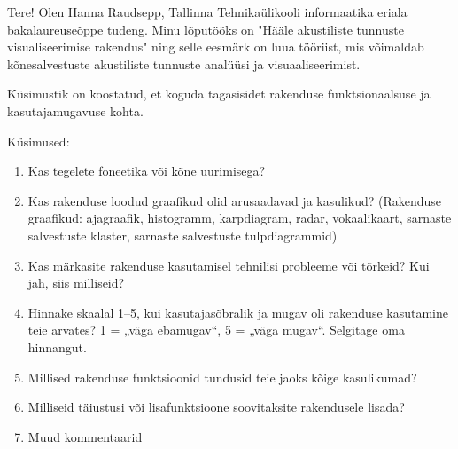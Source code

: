 Tere! Olen Hanna Raudsepp, Tallinna Tehnikaülikooli informaatika eriala bakalaureuseõppe tudeng. Minu lõputööks on "Hääle akustiliste tunnuste visualiseerimise rakendus" ning selle eesmärk on luua tööriist, mis võimaldab kõnesalvestuste akustiliste tunnuste analüüsi ja visuaaliseerimist.

Küsimustik on koostatud, et koguda tagasisidet rakenduse funktsionaalsuse ja kasutajamugavuse kohta.

Küsimused:

\begin{enumerate}
    \item Kas tegelete foneetika või kõne uurimisega?
    \item Kas rakenduse loodud graafikud olid arusaadavad ja kasulikud? (Rakenduse graafikud: ajagraafik, histogramm, karpdiagram, radar, vokaalikaart, sarnaste salvestuste klaster, sarnaste salvestuste tulpdiagrammid) 
    \item Kas märkasite rakenduse kasutamisel tehnilisi probleeme või tõrkeid? Kui jah, siis milliseid?
    \item Hinnake skaalal 1–5, kui kasutajasõbralik ja mugav oli rakenduse kasutamine teie arvates? 1 = „väga ebamugav“, 5 = „väga mugav“. Selgitage oma hinnangut.
    \item Millised rakenduse funktsioonid tundusid teie jaoks kõige kasulikumad?
    \item Milliseid täiustusi või lisafunktsioone soovitaksite rakendusele lisada?
    \item Muud kommentaarid
\end{enumerate}
